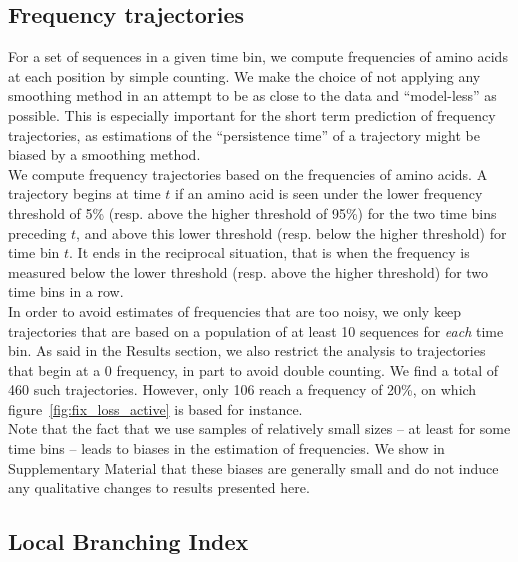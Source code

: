 \documentclass[reprint,amsmath,amssymb,superscriptaddress,showpacs,rmp]{revtex4-1}
\begin{document}
\subsection*{Frequency trajectories} %
\label{sub:frequency_trajectories}

	For a set of sequences in a given time bin, we compute frequencies of amino acids at each position by simple counting. We make the choice of not applying any smoothing method in an attempt to be as close to the data and ``model-less'' as possible. This is especially important for the short term prediction of frequency trajectories, as estimations of the ``persistence time'' of a trajectory might be biased by a smoothing method. \\
	We compute frequency trajectories based on the frequencies of amino acids. A trajectory begins at time $t$ if an amino acid is seen under the lower frequency threshold of 5\% (resp. above the higher threshold of 95\%) for the two time bins preceding $t$, and above this lower threshold (resp. below the higher threshold) for time bin $t$. It ends in the reciprocal situation, that is when the frequency is measured below the lower threshold (resp. above the higher threshold) for two time bins in a row. \\
	In order to avoid estimates of frequencies that are too noisy, we only keep trajectories that are based on a population of at least 10 sequences for \emph{each} time bin. As said in the Results section, we also restrict the analysis to trajectories that begin at a $0$ frequency, in part to avoid double counting. We find a total of 460 such trajectories. However, only 106 reach a frequency of 20\%, on which figure~\ref{fig:fix_loss_active} is based for instance.  \\
	Note that the fact that we use samples of relatively small sizes -- at least for some time bins -- leads to biases in the estimation of frequencies. We show in Supplementary Material that these biases are generally small and do not induce any qualitative changes to results presented here. 


\subsection*{Local Branching Index} %
\label{sub:local_branching_index}
\end{document}
